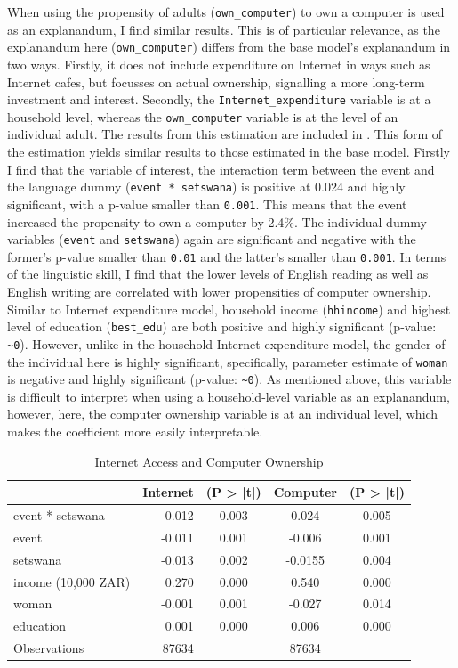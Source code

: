 \documentclass[a4paper,british]{article}\usepackage[]{graphicx}\usepackage[]{xcolor}
\providecommand{\tabularnewline}{\\}
\providecommand*{\code}[1]{\texttt{#1}}
\begin{document}
When using the propensity of adults (\code{own\_computer}) to own
a computer is used as an explanandum, I find similar results. This
is of particular relevance, as the explanandum here (\code{own\_computer})
differs from the base model's explanandum in two ways. Firstly, it
does not include expenditure on Internet in ways such as Internet
cafes, but focusses on actual ownership, signalling a more long-term
investment and interest. Secondly, the \code{Internet\_expenditure}
variable is at a household level, whereas the \code{own\_computer}
variable is at the level of an individual adult. The results from
this estimation are included in . This form of
the estimation yields similar results to those estimated in the base
model. Firstly I find that the variable of interest, the interaction
term between the event and the language dummy (\code{event {*} setswana})
is positive at 0.024 and highly significant, with a p-value smaller
than \code{0.001}. This means that the event increased the propensity
to own a computer by 2.4\%. The individual dummy variables (\code{event}
and \code{setswana}) again are significant and negative with the
former's p-value smaller than \code{0.01} and the latter's smaller
than \code{0.001}. In terms of the linguistic skill, I find that
the lower levels of English reading as well as English writing are
correlated with lower propensities of computer ownership. Similar
to Internet expenditure model, household income (\code{hhincome})
and highest level of education (\code{best\_edu}) are both positive
and highly significant (p-value: \code{\textasciitilde 0}). However,
unlike in the household Internet expenditure model, the gender of
the individual here is highly significant, specifically, parameter
estimate of \code{woman} is negative and highly significant (p-value:
\code{\textasciitilde 0}). As mentioned above, this variable is difficult
to interpret when using a household-level variable as an explanandum,
however, here, the computer ownership variable is at an individual
level, which makes the coefficient more easily interpretable.

\begin{table}

\caption{Internet Access and Computer Ownership}

\begin{centering}
\label{tab:esti-full}
\par\end{centering}
\centering{}%
\begin{tabular}{|l|r|c|c|c|}
\hline 
 &
Internet &
(P > |t|) &
Computer &
(P > |t|)\tabularnewline
\hline 
\hline 
event {*} setswana &
0.012 &
0.003 &
0.024 &
0.005\tabularnewline
\hline 
event &
-0.011 &
0.001 &
-0.006 &
0.001\tabularnewline
\hline 
setswana &
-0.013 &
0.002 &
-0.0155 &
0.004\tabularnewline
\hline 
income (10,000 ZAR) &
0.270 &
0.000 &
0.540 &
0.000\tabularnewline
\hline 
woman &
-0.001 &
0.001 &
-0.027 &
0.014\tabularnewline
\hline 
education &
0.001 &
0.000 &
0.006 &
0.000\tabularnewline
\hline 
Observations &
87634 &
 &
87634 &
\tabularnewline
\hline 
\end{tabular}
\end{table}
\end{document}
